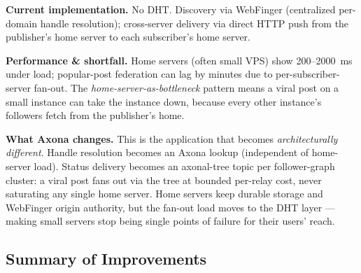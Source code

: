 \documentclass[nobib]{tufte-handout}
\begin{document}
\textbf{Current implementation.} No DHT. Discovery via WebFinger
(centralized per-domain handle resolution); cross-server delivery via
direct HTTP push from the publisher's home server to each subscriber's
home server.

\textbf{Performance \& shortfall.} Home servers (often small VPS) show
200--2000~ms under load; popular-post federation can lag by minutes due
to per-subscriber-server fan-out. The \emph{home-server-as-bottleneck}
pattern means a viral post on a small instance can take the instance
down, because every other instance's followers fetch from the
publisher's home.

\textbf{What Axona changes.} This is the application that becomes
\emph{architecturally different}. Handle resolution becomes an Axona
lookup (independent of home-server load). Status delivery becomes an
axonal-tree topic per follower-graph cluster: a viral post fans out via
the tree at bounded per-relay cost, never saturating any single home
server. Home servers keep durable storage and WebFinger origin
authority, but the fan-out load moves to the DHT layer --- making small
servers stop being single points of failure for their users' reach.

\subsection{Summary of Improvements}
\end{document}
